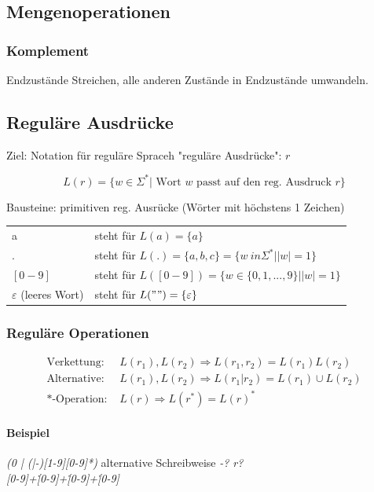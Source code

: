 \subsection{Mengenoperationen}
\subsubsection{Komplement}

Endzustände Streichen, alle anderen Zustände in Endzustände umwandeln.


\subsection{Reguläre Ausdrücke}

Ziel: Notation für reguläre Spraceh "reguläre Ausdrücke": $r$

\[
	L(r) = \{ w \in \Sigma^\ast | \text{ Wort } w \text{ passt auf den reg. Ausdruck } r\}
\]

Bausteine: primitiven reg. Ausrücke (Wörter mit höchstens 1 Zeichen)

\begin{tabular}{ l l}
	a & steht für $L(a) = \{ a \}$ \\
	. & steht für $L(.) = \{a,b,c\} = \{ w \ in \Sigma ^ \ast | |w| = 1 \}$\\
	$[0-9]$ & steht für $L([0-9])=\{w \in \{ 0, 1, ..., 9\}| |w| = 1 \}$\\
	$\varepsilon$ (leeres Wort) & steht für $L("") = \{ \varepsilon \}$
\end{tabular}

\subsubsection{Reguläre Operationen}

\begin{align*}
\text{Verkettung: } & L(r_1), L(r_2) \Rightarrow L(r_1,r_2) = L(r_1)L(r_2) \\
\text{Alternative: }& L(r_1),L(r_2) \Rightarrow L(r_1|r_2) = L(r_1) \cup L(r_2) \\
\text{*-Operation: }& L(r) \Rightarrow L(r^\ast) = L(r)^\ast
\end{align*}

\paragraph{Beispiel}

	\emph{(0 | (|-)[1-9][0-9]*)}  alternative Schreibweise \emph{-? r?} \\
	\emph{[0-9]+\.[0-9]+\.[0-9]+\.[0-9]}


